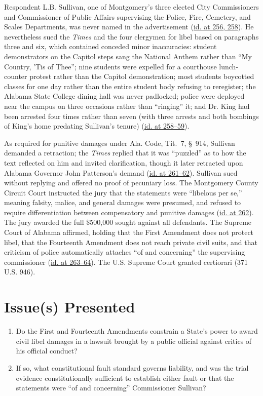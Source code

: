 \documentclass[12pt]{article}
\begin{document}
Respondent L.B. Sullivan, one of Montgomery's three elected City Commissioners and Commissioner of Public Affairs supervising the Police, Fire, Cemetery, and Scales Departments, was never named in the advertisement (\href{https://supreme.justia.com/cases/federal/us/376/254/}{id. at 256, 258}). He nevertheless sued the \textit{Times} and the four clergymen for libel based on paragraphs three and six, which contained conceded minor inaccuracies: student demonstrators on the Capitol steps sang the National Anthem rather than ``My Country, 'Tis of Thee''; nine students were expelled for a courthouse lunch-counter protest rather than the Capitol demonstration; most students boycotted classes for one day rather than the entire student body refusing to reregister; the Alabama State College dining hall was never padlocked; police were deployed near the campus on three occasions rather than ``ringing'' it; and Dr. King had been arrested four times rather than seven (with three arrests and both bombings of King's home predating Sullivan's tenure) (\href{https://www.law.cornell.edu/supremecourt/text/376/254}{id. at 258--59}).

As required for punitive damages under Ala. Code, Tit.~7, \S~914, Sullivan demanded a retraction; the \textit{Times} replied that it was ``puzzled'' as to how the text reflected on him and invited clarification, though it later retracted upon Alabama Governor John Patterson's demand (\href{https://supreme.justia.com/cases/federal/us/376/254/}{id. at 261--62}). Sullivan sued without replying and offered no proof of pecuniary loss. The Montgomery County Circuit Court instructed the jury that the statements were ``libelous per se,'' meaning falsity, malice, and general damages were presumed, and refused to require differentiation between compensatory and punitive damages (\href{https://supreme.justia.com/cases/federal/us/376/254/}{id. at 262}). The jury awarded the full \$500,000 sought against all defendants. The Supreme Court of Alabama affirmed, holding that the First Amendment does not protect libel, that the Fourteenth Amendment does not reach private civil suits, and that criticism of police automatically attaches ``of and concerning'' the supervising commissioner (\href{https://supreme.justia.com/cases/federal/us/376/254/}{id. at 263--64}). The U.S. Supreme Court granted certiorari (371 U.S. 946).

\section{Issue(s) Presented}
\begin{enumerate}
  \item Do the First and Fourteenth Amendments constrain a State's power to award civil libel damages in a lawsuit brought by a public official against critics of his official conduct?
  \item If so, what constitutional fault standard governs liability, and was the trial evidence constitutionally sufficient to establish either fault or that the statements were ``of and concerning'' Commissioner Sullivan?
\end{enumerate}
\end{document}
